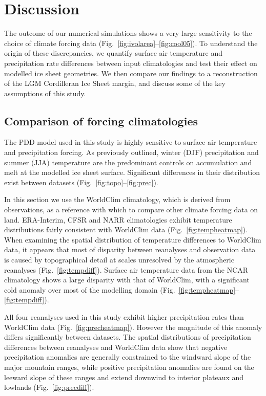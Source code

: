 \section{Discussion}
\label{sec:discussion}

The outcome of our numerical simulations shows a very large sensitivity to the choice of climate forcing data (Fig.~\ref{fig:ivolarea}--\ref{fig:cool05}). To understand the origin of these discrepancies, we quantify surface air temperature and precipitation rate differences between input climatologies and test their effect on modelled ice sheet geometries. We then compare our findings to a reconstruction of the LGM Cordilleran Ice Sheet margin, and discuss some of the key assumptions of this study.
\subsection{Comparison of forcing climatologies}

The PDD model used in this study is highly sensitive to surface air temperature and precipitation forcing. As previously outlined, winter (DJF) precipitation and summer (JJA) temperature are the predominant controls on accumulation and melt at the modelled ice sheet surface. Significant differences in their distribution exist between datasets (Fig.~\ref{fig:topo}--\ref{fig:prec}).

In this section we use the WorldClim climatology, which is derived from observations, as a reference with which to compare other climate forcing data on land. ERA-Interim, CFSR and NARR climatologies exhibit temperature distributions fairly consistent with WorldClim data (Fig.~\ref{fig:tempheatmap}). When examining the spatial distribution of temperature differences to WorldClim data, it appears that most of disparity between reanalyses and observation data is caused by topographical detail at scales unresolved by the atmospheric reanalyses (Fig.~\ref{fig:tempdiff}). Surface air temperature data from the NCAR climatology shows a large disparity with that of WorldClim, with a significant cold anomaly over most of the modelling domain (Fig.~\ref{fig:tempheatmap}--\ref{fig:tempdiff}).

All four reanalyses used in this study exhibit higher precipitation rates than WorldClim data (Fig.~\ref{fig:precheatmap}). However the magnitude of this anomaly differs significantly between datasets. The spatial distributions of precipitation differences between reanalyses and WorldClim data show that negative precipitation anomalies are generally constrained to the windward slope of the major mountain ranges, while positive precipitation anomalies are found on the leeward slope of these ranges and extend downwind to interior plateaux and lowlands (Fig.~\ref{fig:precdiff}).

